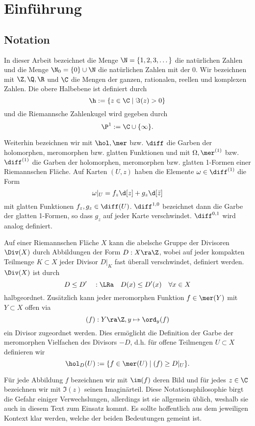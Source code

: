 
\section{Einführung}
\label{sec:einführung}

\subsection{Notation}
\label{sec:notation}

In dieser Arbeit bezeichnet die Menge $\N = \{1, 2, 3, \dots\}$ die natürlichen
Zahlen und die Menge $\N_0 = \{0 \} \cup \N$ die natürlichen Zahlen mit der
0. Wir bezeichnen mit $\Z, \Q, \R$ und $\C$ die Mengen der ganzen,
rationalen, reellen und komplexen Zahlen. Die 
obere Halbebene ist definiert durch
\[
\h := \{ z \in \C \mid \Im(z) > 0 \}
\]
und die Riemannsche Zahlenkugel wird gegeben durch
\[
\P^1 := \C \cup \{\infty\}.
\]

Weiterhin bezeichnen wir mit $\hol, \mer$ bzw. $\diff$
die Garben der holomorphen, meromorphen bzw. glatten Funktionen und mit
$\Omega, \mer^{(1)}$ bzw. $\diff^{(1)}$ die Garben der holomorphen,
meromorphen bzw. glatten 1-Formen einer Riemannschen Fläche. Auf Karten $(U,z)$ haben die
Elemente $\omega \in \diff^{(1)}$ die Form
\[
\omega|_U = f_z \d[z] + g_z\d[\bar z]
\]
mit glatten Funktionen $f_z,g_z \in \diff(U)$. $\diff^{1,0}$ bezeichnet
dann die Garbe der glatten 1-Formen, so dass $g_z$ auf jeder Karte
verschwindet. $\diff^{0,1}$ wird analog definiert.

Auf einer Riemannschen Fläche $X$ kann die abelsche Gruppe der
Divisoren $\Div(X)$ durch Abbildungen der Form $D: X \ra \Z$, wobei
auf jeder kompakten Teilmenge $K \subset X$ jeder Divisor $D|_K$ fast
überall verschwindet, definiert werden. $\Div(X)$ ist durch
\[
D \leq D' \quad :\LRa \quad D(x) \leq D'(x) \quad \forall x \in X
\]
halbgeordnet. Zusätzlich kann jeder meromorphen Funktion $f \in \mer(Y)$ mit $Y
\subset X$ offen via
\[
(f): Y \ra \Z, y \mapsto \ord_y(f)
\]
ein Divisor zugeordnet werden. Dies ermöglicht die Definition der
Garbe der meromorphen Vielfachen des Divisors $-D$, d.h. für offene
Teilmengen $U \subset X$ definieren wir
\[
\hol_D(U) := \{f \in \mer(U) \mid (f) \geq D|_U \}.
\]

Für jede Abbildung $f$ bezeichnen wir mit $\im(f)$ deren Bild und für
jedes $z \in \C$ bezeichnen wir mit $\Im(z)$ seinen Imaginärteil. Diese
Notationsphilosophie birgt die Gefahr einiger Verwechslungen,
allerdings ist sie allgemein üblich, weshalb sie auch in diesem Text
zum Einsatz kommt. Es sollte hoffentlich aus dem jeweiligen Kontext
klar werden, welche der beiden Bedeutungen gemeint ist.

